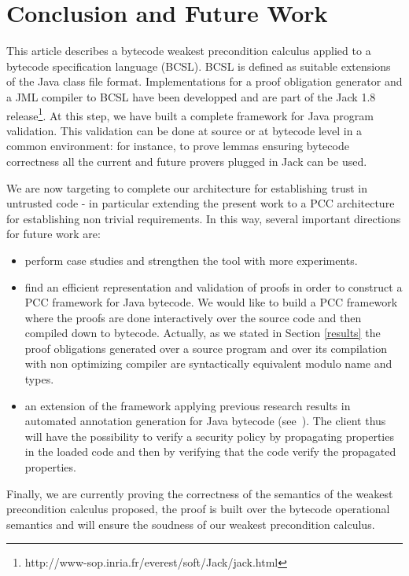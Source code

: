 \section{Conclusion and Future Work}\label{conclusion}
This article describes a bytecode weakest precondition calculus applied to a bytecode specification language (BCSL).
BCSL is defined as suitable extensions of the Java class file format.
Implementations for a proof obligation generator and a JML compiler to BCSL have been developped and are part of the Jack 1.8 release\footnote{http://www-sop.inria.fr/everest/soft/Jack/jack.html}.
At this step, we have built a complete framework for Java program validation. This validation can be done at source or at bytecode level in a common environment: for instance, to prove lemmas ensuring bytecode correctness all the current and future provers plugged in Jack can be used.

We are now targeting to complete our architecture for establishing trust in untrusted code - in particular extending the present work to a PCC architecture for establishing non trivial requirements.  
In this way, several important directions for future work are:
\begin{itemize}
\item perform case studies and strengthen the tool with more experiments.
\item find an efficient representation and validation of proofs in order to construct a PCC framework for Java bytecode. We would like to build a PCC framework where the proofs are done interactively over the source code
and then compiled down to bytecode. Actually, as we stated in Section \ref{results} the proof obligations generated over a source program and over its compilation with non optimizing compiler are syntactically equivalent modulo name and types. 
\item an extension of the framework applying previous research results in automated annotation generation for Java bytecode (see~\cite{PBBHL}). The client thus will have the possibility to verify a security policy by propagating properties in the loaded code and then by verifying that the code verify the propagated properties.

\end{itemize}
Finally, we are currently proving the correctness of the semantics of the weakest precondition calculus proposed, the proof is built over the bytecode operational semantics and will ensure the soudness of our weakest precondition calculus.

